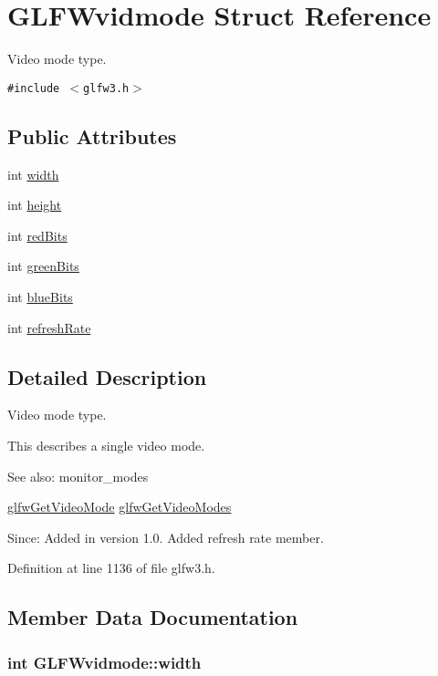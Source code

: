 \hypertarget{struct_g_l_f_wvidmode}{
\section{GLFWvidmode Struct Reference}
\label{struct_g_l_f_wvidmode}
}
Video mode type.  


{\tt \#include $<$glfw3.h$>$}

\subsection*{Public Attributes}
\begin{CompactItemize}
\item 
int \hyperlink{struct_g_l_f_wvidmode_698dcb200562051a7249cb6ae154c71d}{width}
\item 
int \hyperlink{struct_g_l_f_wvidmode_c65942a5f6981695517437a9d571d03c}{height}
\item 
int \hyperlink{struct_g_l_f_wvidmode_6066c4ecd251098700062d3b735dba1b}{redBits}
\item 
int \hyperlink{struct_g_l_f_wvidmode_292fdd281f3485fb3ff102a5bda43faa}{greenBits}
\item 
int \hyperlink{struct_g_l_f_wvidmode_f310977f58d2e3b188175b6e3d314047}{blueBits}
\item 
int \hyperlink{struct_g_l_f_wvidmode_791bdd6c7697b09f7e9c97054bf05649}{refreshRate}
\end{CompactItemize}


\subsection{Detailed Description}
Video mode type. 

This describes a single video mode.

\begin{Desc}
\item[See also:]monitor\_\-modes 

\hyperlink{group__monitor_gc234b63ec525c70d7e18ac84aca088c6}{glfwGetVideoMode} \hyperlink{group__monitor_g811c28d61595e630774389985947c665}{glfwGetVideoModes}\end{Desc}
\begin{Desc}
\item[Since:]Added in version 1.0.  Added refresh rate member. \end{Desc}


Definition at line 1136 of file glfw3.h.

\subsection{Member Data Documentation}
\hypertarget{struct_g_l_f_wvidmode_698dcb200562051a7249cb6ae154c71d}{
\subsubsection[width]{\setlength{\rightskip}{0pt plus 5cm}int {\bf GLFWvidmode::width}}}
\label{struct_g_l_f_wvidmode_698dcb200562051a7249cb6ae154c71d}


